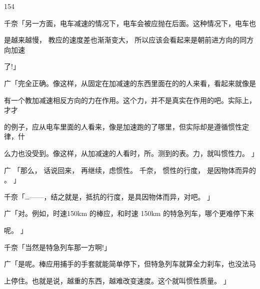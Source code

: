 154\par
千奈「另一方面，电车减速的情况下，电车会被应抛在后面。这种情况下，电车也\par
是越来越慢， 教应的速度差也渐渐变大， 所以应该会看起来是朝前进方向的同方向加速\par
了!」\par
广「完全正确。像这样，从固定在加减速的东西里面在的的人来看，看起来就像是\par
有一个教加减速相反方向的力在作用。这个力，并不是真实在作用的吧。实际上，才才\par
的例子，应从电车里面的人看来，像是加速跑的了哪里，但实际却是遵循惯性定律，什\par
么力也没受到。像这样，从加减速的人看时，所。测到的表。力，就叫惯性力。 」\par
广 「那么， 话说回来， 再继续，虑惯性。 千奈， 惯性的行度， 是因物体而异的 。 」\par
千奈「…——，结之就是，抵抗的行度，是具因物体而异，对吧。 」\par
广「对。例如，时速150km 的棒应，和时速 150km 的特急列车，哪个更难停下来\par
呢。 」\par
千奈「当然是特急列车那一方啊!」\par
广「是呢。棒应用捕手的手套就能简单停下，但特急列车就算全力刹车，也没法马\par
上停住。也就是说，越重的东西，越难改变速度。这个就叫惯性质量。 」\par

